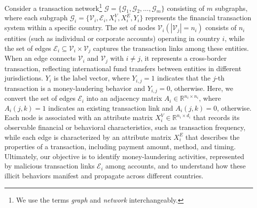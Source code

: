 \documentclass[11pt,english]{article}
\begin{document}
Consider a transaction network\footnote{We use the terms \textit{graph} and \textit{network} interchangeably.} $\mathcal{G}=\{\mathcal{G}_1, \mathcal{G}_2, \ldots, \mathcal{G}_m\}$ consisting of $m$ subgraphs, where each subgraph $\mathcal{G}_i=\{\mathcal{V}_i, \mathcal{E}_i, X_i^V, X_i^E, Y_i\}$ represents the financial transaction system within a specific country. The set of nodes $\mathcal{V}_i (|\mathcal{V}_j|=n_i)$ consists of $n_i$ entities (such as individual or corporate accounts) operating in country $i$, while the set of edges $\mathcal{E}_i \subseteq \mathcal{V}_i \times \mathcal{V}_j $ captures the transaction links among these entities. When an edge connects $\mathcal{V}_i$ and $\mathcal{V}_j$ with $i \neq j$, it represents a cross-border transaction, reflecting international fund transfers between entities in different jurisdictions. $Y_i$ is the label vector, where $Y_{i,j}=1$ indicates that the $j$-th transaction is a money-laudering behavior and $Y_{i,j}=0$, otherwise. Here, we convert the set of edges $\mathcal{E}_i$ into an adjacency matrix $A_i\in \mathbb{R}^{n_i \times n_i}$, where $A_i(j,k)=1$ indicates an existing transaction link and  $A_i(j,k)=0$, otherwise. Each node is associated with an attribute matrix $X_i^V\in \mathbb{R}^{n_i \times d_i}$ that records its observable financial or behavioral characteristics, such as transaction frequency, while each edge is characterized by an attribute matrix $X_i^E$ that describes the properties of a transaction, including payment amount, method, and timing. Ultimately, our objective is to identify money-laundering activities, represented by malicious transaction links $\mathcal{E}_i$ among accounts, and to understand how these illicit behaviors manifest and propagate across different countries.
\end{document}
